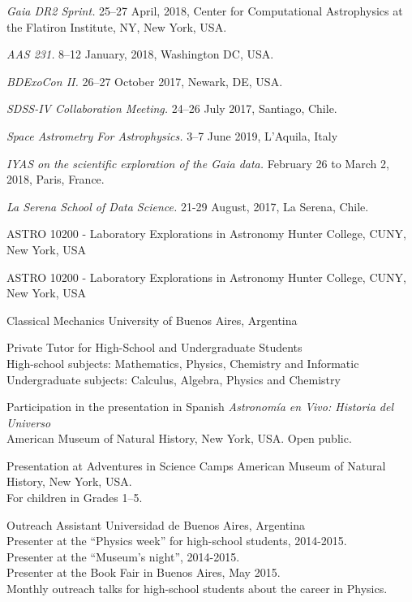 \documentclass[10pt]{cv}
\newcommand\tab[1][1cm]{\hspace*{#1}}
\begin{document}
\begin{llist}
\textit{Gaia DR2 Sprint.} 25--27 April, 2018, Center for Computational Astrophysics at the Flatiron Institute, NY, New York, USA. 

\textit{AAS 231.} 8--12 January, 2018, Washington DC, USA.

\textit{BDExoCon II.} 26--27 October 2017, Newark, DE, USA.

\textit{SDSS-IV Collaboration Meeting.} 24--26 July 2017, Santiago, Chile.

\textit{Space Astrometry For Astrophysics.} 3--7 June 2019, L'Aquila, Italy

\textit{IYAS on the scientific exploration of the Gaia data.} February 26 to March 2, 2018, Paris, France.

\textit{La Serena School of Data Science.} 21-29 August, 2017, La Serena, Chile.



ASTRO 10200 - Laboratory Explorations in Astronomy
Hunter College, CUNY, New York, USA


ASTRO 10200 - Laboratory Explorations in Astronomy
Hunter College, CUNY, New York, USA


Classical Mechanics
University of Buenos Aires, Argentina


Private Tutor 
for High-School and Undergraduate Students\\
High-school subjects: Mathematics, Physics, Chemistry and Informatic\\
Undergraduate subjects: Calculus, Algebra, Physics and Chemistry 


Participation in the presentation in Spanish
\textit{Astronomía en Vivo: Historia del Universo}\\
American Museum of Natural History, New York, USA. Open public.

Presentation at Adventures in Science Camps
American Museum of Natural History, New York, USA. \\
For children in Grades 1--5.

Outreach Assistant
Universidad de Buenos Aires, Argentina\\
\tab Presenter at the ``Physics week'' for high-school students, 2014-2015.\\
\tab Presenter at the ``­Museum's night'', 2014-2015.\\
\tab Presenter at the Book Fair in Buenos Aires, May 2015.\\
\tab Monthly outreach talks for high-school students about the career in Physics.


\end{llist}
\end{document}
